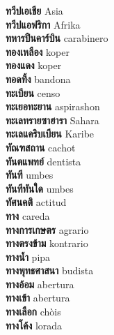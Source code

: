 \textbf{ ทวีปเอเชีย  } Asia \\
\textbf{ ทวีปแอฟริกา  } Afrika \\
\textbf{ ทหารปืนคาร์บิน  } carabinero \\
\textbf{ ทองเหลือง  } koper \\
\textbf{ ทองแดง  } koper \\
\textbf{ ทอดทิ้ง  } bandona \\
\textbf{ ทะเบียน  } censo \\
\textbf{ ทะเยอทะยาน  } aspirashon \\
\textbf{ ทะเลทรายซาฮารา  } Sahara \\
\textbf{ ทะเลแคริบเบียน  } Karibe \\
\textbf{ ทัณฑสถาน  } cachot \\
\textbf{ ทันตแพทย์  } dentista \\
\textbf{ ทันที  } umbes \\
\textbf{ ทันทีทันใด  } umbes \\
\textbf{ ทัศนคติ  } actitud \\
\textbf{ ทาง  } careda \\
\textbf{ ทางการเกษตร  } agrario \\
\textbf{ ทางตรงข้าม  } kontrario \\
\textbf{ ทางน้ำ  } pipa \\
\textbf{ ทางพุทธศาสนา  } budista \\
\textbf{ ทางอ้อม  } abertura \\
\textbf{ ทางเข้า  } abertura \\
\textbf{ ทางเลือก  } chòis \\
\textbf{ ทางโค้ง  } lorada \\
